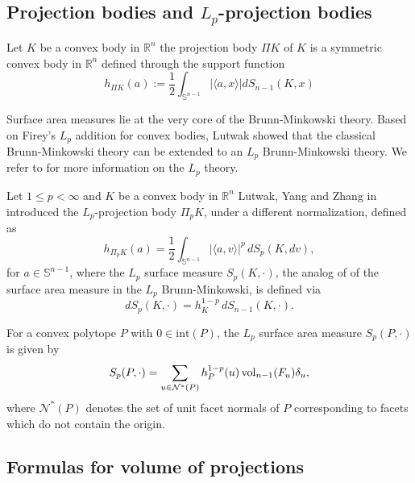 \documentclass[10pt]{amsart}
\newcommand{\ls}{\leqslant}
\newcommand{\1}{\textbf{1}}
\numberwithin{equation}{section} %
\theoremstyle{remark}
\theoremstyle{definition}
\begin{document}
\subsection{Projection bodies and $L_p$-projection bodies}

Let $K$ be a convex body in $\mathbb{R}^n$ the projection body $\Pi K$ of $K$ is a symmetric convex body in $\mathbb{R}^n$ defined through the support function 
\[
h_{\Pi K}(a):=\frac{1}{2}\int_{\mathbb{S}^{n-1}}|\langle a,x\rangle|dS_{n-1}(K,x)
\]

Surface area measures lie at the very core of the Brunn-Minkowski theory.  Based on Firey’s $L_p$ addition  for convex bodies, Lutwak  showed that the classical Brunn-Minkowski theory can be extended to an $L_p$ Brunn-Minkowski theory. We refer to \cite{schneider2013convex,gardner2006geometric} for more information on the $L_p$ theory.


Let $1\ls p<\infty$ and $K$ be a convex body in $\mathbb{R}^n$ Lutwak, Yang and Zhang in \cite{lutwak2000lp} introduced the $L_p$-projection body $\Pi_pK$, under a different normalization, defined as
\begin{equation}\label{L_p proj body}
h_{\Pi_p K}(a)=\frac{1}{2}\int_{\mathbb{S}^{n-1}}|\langle a,v\rangle|^p\,dS_{p}(K,dv),
\end{equation}
for $a\in \mathbb{S}^{n-1}$, where the $L_p$ surface measure $S_p(K,\cdot)$, the analog of of the surface area measure in the $L_p$ Brunn-Minkowski,  is defined via
\[
dS_{p}(K,\cdot)=h_{K}^{1-p}\,dS_{n-1}(K,\cdot).
\]


 For a convex polytope $P$ with $0\in \text{int}(P)$, the $L_p$ surface area measure $S_p(P,\cdot)$ is given by 
\begin{equation}\label{S_{p}(P)}
S_{p}(P,\cdot)=\sum_{u\in \mathcal{N}^{\ast}(P)}h^{1-p}_{P}(u)\operatorname{vol}_{n-1}(F_u)\delta_u,
\end{equation}
where $\mathcal{N}^{\ast}(P)$ denotes the set of unit facet normals of $P$ corresponding to facets which
do not contain the origin.

\subsection{Formulas for volume of projections}
\end{document}
